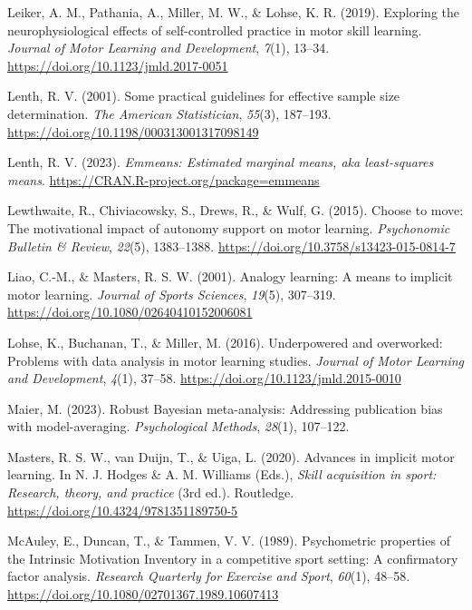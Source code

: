 \documentclass[
  doc, donotrepeattitle,floatsintext]{apa7}
\newlength{\cslhangindent}
\newlength{\cslentryspacingunit} %
\newenvironment{CSLReferences}[2] %
 {%
  \setlength{\parindent}{0pt}
  \ifodd #1
  \let\oldpar\par
  \def\par{\hangindent=\cslhangindent\oldpar}
  \fi
  \setlength{\parskip}{#2\cslentryspacingunit}
 }%
 {}
\begin{document}
\begin{CSLReferences}{1}{0}
\leavevmode{}%
Leiker, A. M., Pathania, A., Miller, M. W., \& Lohse, K. R. (2019). Exploring the neurophysiological effects of self-controlled practice in motor skill learning. \emph{Journal of Motor Learning and Development}, \emph{7}(1), 13--34. \url{https://doi.org/10.1123/jmld.2017-0051}

\leavevmode{}%
Lenth, R. V. (2001). Some practical guidelines for effective sample size determination. \emph{The American Statistician}, \emph{55}(3), 187--193. \url{https://doi.org/10.1198/000313001317098149}

\leavevmode{}%
Lenth, R. V. (2023). \emph{Emmeans: Estimated marginal means, aka least-squares means}. \url{https://CRAN.R-project.org/package=emmeans}

\leavevmode{}%
Lewthwaite, R., Chiviacowsky, S., Drews, R., \& Wulf, G. (2015). Choose to move: {The} motivational impact of autonomy support on motor learning. \emph{Psychonomic Bulletin \& Review}, \emph{22}(5), 1383--1388. \url{https://doi.org/10.3758/s13423-015-0814-7}

\leavevmode{}%
Liao, C.-M., \& Masters, R. S. W. (2001). Analogy learning: {A} means to implicit motor learning. \emph{Journal of Sports Sciences}, \emph{19}(5), 307--319. \url{https://doi.org/10.1080/02640410152006081}

\leavevmode{}%
Lohse, K., Buchanan, T., \& Miller, M. (2016). Underpowered and overworked: {Problems} with data analysis in motor learning studies. \emph{Journal of Motor Learning and Development}, \emph{4}(1), 37--58. \url{https://doi.org/10.1123/jmld.2015-0010}

\leavevmode{}%
Maier, M. (2023). Robust {Bayesian} meta-analysis: {Addressing} publication bias with model-averaging. \emph{Psychological Methods}, \emph{28}(1), 107--122.

\leavevmode{}%
Masters, R. S. W., van Duijn, T., \& Uiga, L. (2020). Advances in implicit motor learning. In N. J. Hodges \& A. M. Williams (Eds.), \emph{Skill acquisition in sport: {Research}, theory, and practice} (3rd ed.). Routledge. \url{https://doi.org/10.4324/9781351189750-5}

\leavevmode{}%
McAuley, E., Duncan, T., \& Tammen, V. V. (1989). Psychometric properties of the {Intrinsic Motivation Inventory} in a competitive sport setting: {A} confirmatory factor analysis. \emph{Research Quarterly for Exercise and Sport}, \emph{60}(1), 48--58. \url{https://doi.org/10.1080/02701367.1989.10607413}


\end{CSLReferences}
\end{document}
